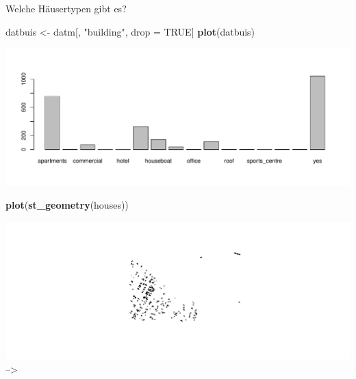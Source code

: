 \documentclass[ignorenonframetext,]{beamer}
\newenvironment{Shaded}{\begin{snugshade}}{\end{snugshade}}
\newcommand{\KeywordTok}[1]{\textcolor[rgb]{0.26,0.66,0.93}{\textbf{#1}}}
\newcommand{\NormalTok}[1]{\textcolor[rgb]{0.74,0.68,0.62}{#1}}
\newcommand{\OperatorTok}[1]{\textcolor[rgb]{0.74,0.68,0.62}{#1}}
\newcommand{\OtherTok}[1]{\textcolor[rgb]{0.74,0.68,0.62}{#1}}
\newcommand{\StringTok}[1]{\textcolor[rgb]{0.02,0.61,0.04}{#1}}
\begin{document}
\begin{frame}[fragile]{Welche Häusertypen gibt es?}
\protect\hypertarget{welche-hausertypen-gibt-es}{}

\begin{Shaded}
\end{Shaded}

\begin{Shaded}
\begin{Highlighting}[]
\NormalTok{datbuis <-}\StringTok{ }\NormalTok{datm[, }\StringTok{"building"}\NormalTok{, drop =}\StringTok{ }\OtherTok{TRUE}\NormalTok{]}
\KeywordTok{plot}\NormalTok{(datbuis)}
\end{Highlighting}
\end{Shaded}

\includegraphics{B7_simplefeatures_files/figure-beamer/unnamed-chunk-27-1.pdf}

\begin{Shaded}
\begin{Highlighting}[]
\KeywordTok{plot}\NormalTok{(}\KeywordTok{st_geometry}\NormalTok{(houses))}
\end{Highlighting}
\end{Shaded}

\includegraphics{B7_simplefeatures_files/figure-beamer/unnamed-chunk-29-1.pdf}
--\textgreater{}

\end{frame}
\end{document}
